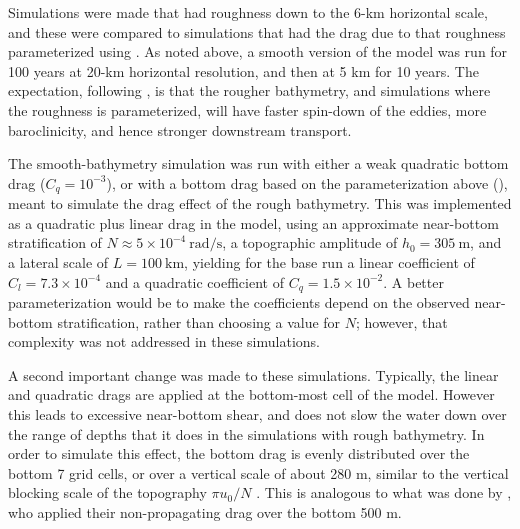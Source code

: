 \documentclass[twocol]{ametsocV5}
\newcommand{\tempS}[1]{}
\begin{document}
Simulations were made that had roughness down to the 6-km horizontal scale, and these were compared to simulations that had the drag due to that roughness parameterized using .  As noted above, a smooth version of the model was run for 100 years at 20-km horizontal resolution, and then at 5 km for 10 years.   The expectation, following \citet{Marshall_2017}, is that the rougher bathymetry, and simulations where the roughness is parameterized, will have faster spin-down of the eddies, more baroclinicity, and hence stronger downstream transport.

The smooth-bathymetry simulation was run with either a weak quadratic bottom drag ($C_q = 10^{-3}$), or with a bottom drag based on the parameterization above (), meant to simulate the drag effect of the rough bathymetry. This was implemented as a quadratic plus linear drag in the model, using an approximate near-bottom stratification of $N\approx 5\times10^{-4}\ \mathrm{rad / s}$, a topographic amplitude of $h_0 = 305\ \mathrm{m}$, and a lateral scale of $L = 100\ \mathrm{km}$, yielding for the base run a linear coefficient of $C_l = 7.3\times 10^{-4}$ and a quadratic coefficient of $C_q = 1.5\times 10^{-2}$.    A better parameterization would be to make the coefficients depend on the observed near-bottom stratification, rather than choosing a value for $N$; however, that complexity was not addressed in these simulations.

A second important change was made to these simulations.  Typically, the linear and quadratic drags are applied at the bottom-most cell of the model.  However this leads to excessive near-bottom shear, and does not slow the water down over the range of depths that it does in the simulations with rough bathymetry.  In order to simulate this effect, the bottom drag is evenly distributed over the bottom 7 grid cells, or over a vertical scale of about 280 m, similar to the vertical blocking scale of the topography $\pi u_0/N$ \citep{klymaketal10a}.  This is analogous to what was done by \citet{trossmanetal2016}, who applied their non-propagating drag over the bottom 500 m.
\end{document}
